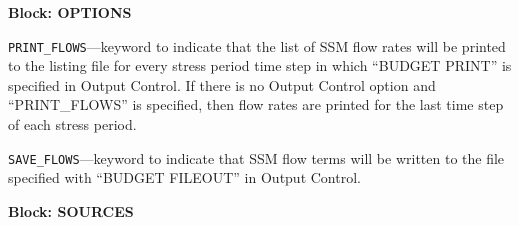 
\item \textbf{Block: OPTIONS}

\begin{description}
\item \texttt{PRINT\_FLOWS}---keyword to indicate that the list of SSM flow rates will be printed to the listing file for every stress period time step in which ``BUDGET PRINT'' is specified in Output Control.  If there is no Output Control option and ``PRINT\_FLOWS'' is specified, then flow rates are printed for the last time step of each stress period.

\item \texttt{SAVE\_FLOWS}---keyword to indicate that SSM flow terms will be written to the file specified with ``BUDGET FILEOUT'' in Output Control.

\end{description}
\item \textbf{Block: SOURCES}

